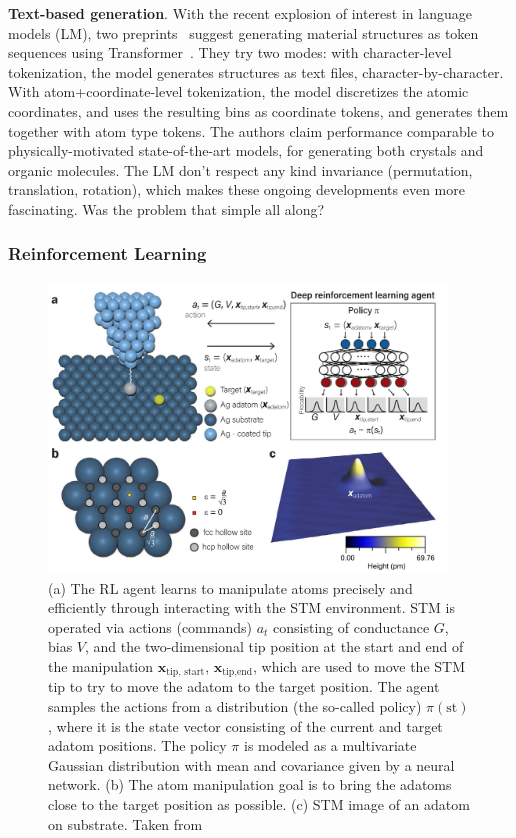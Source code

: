 \textbf{Text-based generation}. With the recent explosion of interest in language models (LM), two preprints~\cite{antunes2023crystal, flam2023language} suggest generating material structures as token sequences using Transformer~\cite{vaswani2017attention}. They try two modes: with character-level tokenization, the model generates structures as text files, character-by-character. With atom+coordinate-level tokenization, the model discretizes the atomic coordinates, and uses the resulting bins as coordinate tokens, and generates them together with atom type tokens. The authors claim performance comparable to physically-motivated state-of-the-art models, for generating both crystals and organic molecules. The LM don't respect any kind invariance (permutation, translation, rotation), which makes these ongoing developments even more fascinating. Was the problem that simple all along?

\subsubsection{Reinforcement Learning}
\label{subsec:Reinforcement}

\begin{figure}[H]
    \noindent
    \centering
    \includegraphics[width=10.6cm]{figures/RL_example.jpg}
    \caption{(a) The RL agent learns to manipulate atoms precisely and efficiently through interacting with the STM environment. STM is operated via actions (commands) $a_t$ consisting of conductance $G$, bias $V$, and the two-dimensional tip position at the start and end of the manipulation $\bm{x}_\text{tip, start}$, $\bm{x}_\text{tip,end}$, which are used to move the STM tip to try to move the adatom to the target position. The agent samples the actions from a distribution (the so-called policy) $\pi(\text{st})$, where it is the state vector consisting of the current and target adatom positions. The policy $\pi$ is modeled as a multivariate Gaussian distribution with mean and covariance given by a neural network. (b) The atom manipulation goal is to bring the adatoms close to the target position as possible. (c) STM image of an  adatom on  substrate. Taken from ~\cite{chen2022precise}}
    \label{fig:rl}
\end{figure}


